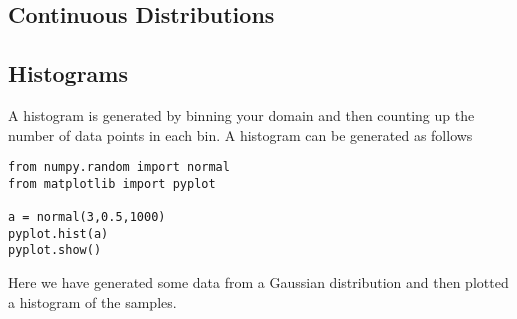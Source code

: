 \subsection*{Continuous Distributions}


\subsection*{Histograms}

A histogram is generated by binning your domain and then counting up
the number of data points in each bin.  A histogram can be generated
as follows
\begin{Verbatim}
from numpy.random import normal
from matplotlib import pyplot

a = normal(3,0.5,1000)
pyplot.hist(a)
pyplot.show()
\end{Verbatim}
Here we have generated some data from a Gaussian distribution and then
plotted a histogram of the samples.




